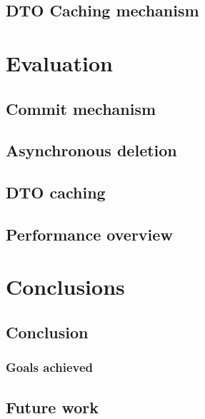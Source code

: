 \documentclass[12pt,a4paper,twoside,openright]{book}
\begin{document}
\section{DTO Caching mechanism}
\label{sec:dto_caching}


\chapter{Evaluation}
\label{chap:evaluation}


\section{Commit mechanism}
\label{sec:commit_mechanism}


\section{Asynchronous deletion}
\label{sec:async_deletion}


\section{DTO caching}
\label{sec:ev_dto_caching}


\section{Performance overview}
\label{sec:performance_overview}


\chapter{Conclusions}
\label{chap:conclusion}


\section{Conclusion}
\label{sec:conclusion}


\subsection{Goals achieved}
\label{ssec:goals}


\section{Future work}
\label{sec:future_work}




\printbibliography[heading=bibintoc]


\backmatter
\end{document}
